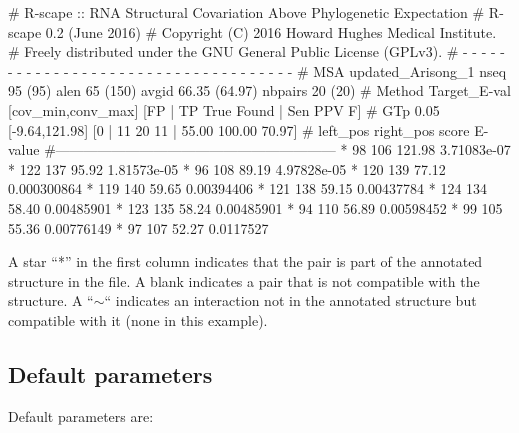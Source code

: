 \begin{sreoutput}
# R-scape :: RNA Structural Covariation Above Phylogenetic Expectation
# R-scape 0.2 (June 2016)
# Copyright (C) 2016 Howard Hughes Medical Institute.
# Freely distributed under the GNU General Public License (GPLv3).
# - - - - - - - - - - - - - - - - - - - - - - - - - - - - - - - - - - - -
# MSA updated_Arisong_1 nseq 95 (95) alen 65 (150) avgid 66.35 (64.97) nbpairs 20 (20)
# Method Target_E-val [cov_min,conv_max] [FP | TP True Found | Sen PPV F] 
# GTp    0.05         [-9.64,121.98]     [0 | 11 20 11 | 55.00 100.00 70.97] 
#       left_pos       right_pos        score   E-value
#------------------------------------------------------------
*	      98	     106	121.98	3.71083e-07
*	     122	     137	95.92	1.81573e-05
*	      96	     108	89.19	4.97828e-05
*	     120	     139	77.12	0.000300864
*	     119	     140	59.65	0.00394406
*	     121	     138	59.15	0.00437784
*	     124	     134	58.40	0.00485901
*	     123	     135	58.24	0.00485901
*	      94	     110	56.89	0.00598452
*	      99	     105	55.36	0.00776149
*	      97	     107	52.27	0.0117527
\end{sreoutput}
A star ``*'' in the first column indicates that the pair is part of
the annotated structure in the  file. A
blank indicates a pair that is not compatible with the structure. A
``$\sim$`` indicates an interaction not in the annotated structure but
compatible with it (none in this example).

\subsection{Default parameters}

Default parameters are:

